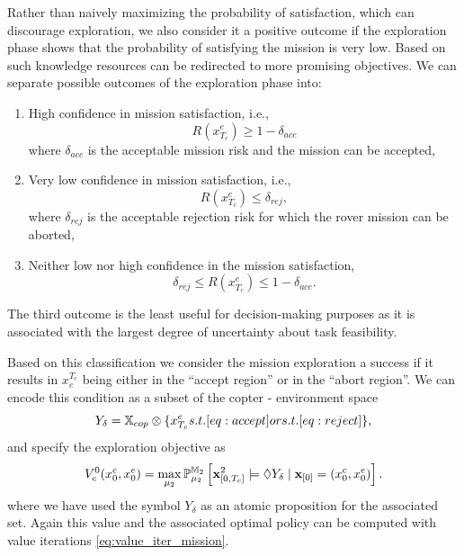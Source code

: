 \documentclass[conference]{IEEEtran}
\begin{document}
Rather than naively maximizing the probability of satisfaction, which can discourage exploration, we also consider it a positive outcome if the exploration phase shows that the probability of satisfying the mission is very low. Based on such knowledge resources can be redirected to more promising objectives. We can separate possible outcomes of the exploration phase into:

\begin{enumerate}
	\item High confidence in mission satisfaction, i.e.,
\begin{equation}\label{eq:accept}
	R(x^e_{T_c})\geq 1-\delta_{acc}
\end{equation}
where $\delta_{acc}$ is the acceptable mission risk and the mission can be accepted,
	\item Very low confidence in mission satisfaction,  i.e.,
\begin{equation}\label{eq:reject}
	R(x^e_{T_c})\leq \delta_{rej},
\end{equation}
where $\delta_{rej}$ is the acceptable rejection risk for which the  rover mission can be aborted,
	\item Neither low nor high confidence in the mission satisfaction,
	 \begin{equation}
	\delta_{rej} \leq R(x^e_{T_c})\leq 1-\delta_{acc}.
\end{equation}
\end{enumerate}
The third outcome is the least useful for decision-making purposes as it is associated with the largest degree of uncertainty about task feasibility.

Based on this classification we consider the mission exploration a success if it results in $x_e^{T_c}$ being either in the ``accept region'' or in the ``abort region''. We can encode this condition as a subset of the copter - environment space
\begin{equation}
Y_\delta = \X_{cop} \otimes
	\{x^e_{T_c} \mbox{ s.t.  }\eqref{eq:accept}\mbox{ or s.t. }\eqref{eq:reject} \},
\end{equation}
and specify the exploration objective as
\begin{equation}
\label{eq:coptervalue}
	V^0_c(x^c_0, x^e_0) = \max_{\mu_2} \mathbb{P}_{\mu_2}^{\MDP_2} \left[ \mathbf{x}^2_{[0, T_c]} \models \lozenge Y_\delta \mid \mathbf{x}_{[0]} = (x^c_0, x^e_0) \right].
\end{equation}
where we have used the symbol $Y_\delta$ as an atomic proposition for the associated set. Again this value and the associated optimal policy can be computed with value iterations \eqref{eq:value_iter_mission}.
\end{document}
